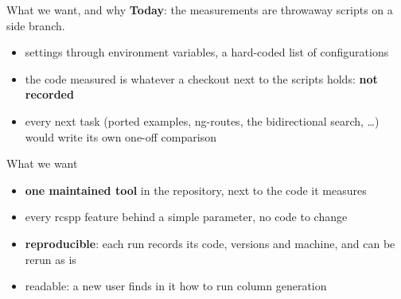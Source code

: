 \documentclass[aspectratio=169]{beamer}
\begin{document}
\begin{frame}{What we want, and why}
  \textbf{Today}: the measurements are throwaway scripts on a side branch.
  \begin{itemize}\small
    \item settings through environment variables, a hard-coded list of configurations
    \item the code measured is whatever a checkout next to the scripts holds: \textbf{not recorded}
    \item every next task (ported examples, ng-routes, the bidirectional search, \ldots) would write its own
      one-off comparison
  \end{itemize}

  \vspace{0.4em}
  \begin{block}{What we want}
    \begin{itemize}\small
      \item \textbf{one maintained tool} in the repository, next to the code it measures
      \item every rcspp feature behind a simple parameter, no code to change
      \item \textbf{reproducible}: each run records its code, versions and machine, and can be rerun as is
      \item readable: a new user finds in it how to run column generation
    \end{itemize}
  \end{block}
\end{frame}
\end{document}
